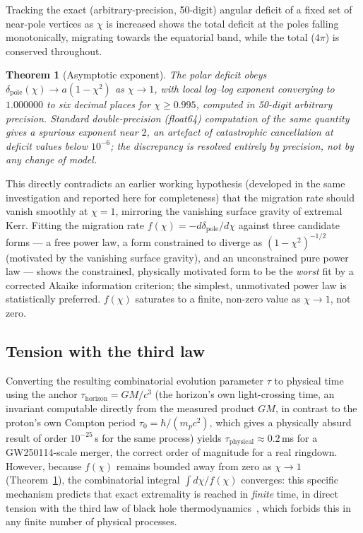 \documentclass[12pt,a4paper]{article}
\newtheorem{theorem}{Theorem}[section]
\newcommand{\hb}{\hbar}
\newcommand{\chif}{\chi}
\begin{document}
Tracking the exact (arbitrary-precision, 50-digit) angular deficit
of a fixed set of near-pole vertices as $\chif$ is increased shows
the total deficit at the poles falling monotonically, migrating
towards the equatorial band, while the total ($4\pi$) is conserved
throughout.

\begin{theorem}[Asymptotic exponent]
\label{thm:exponent}
The polar deficit obeys $\delta_{\mathrm{pole}}(\chif)\to
a(1-\chif^2)$ as $\chif\to1$, with local log--log exponent
converging to $1.000000$ to six decimal places for
$\chif\geq0.995$, computed in 50-digit arbitrary precision. Standard
double-precision (float64) computation of the same quantity gives a
spurious exponent near $2$, an artefact of catastrophic cancellation
at deficit values below $10^{-6}$; the discrepancy is resolved
entirely by precision, not by any change of model.
\end{theorem}

\begin{negativebox}
This directly contradicts an earlier working hypothesis (developed
in the same investigation and reported here for completeness) that
the migration rate should vanish smoothly at $\chif=1$, mirroring
the vanishing surface gravity of extremal Kerr. Fitting the
migration rate $f(\chif)=-d\delta_{\mathrm{pole}}/d\chif$ against
three candidate forms --- a free power law, a form constrained to
diverge as $(1-\chif^2)^{-1/2}$ (motivated by the vanishing surface
gravity), and an unconstrained pure power law --- shows the
constrained, physically motivated form to be the \emph{worst} fit
by a corrected Akaike information criterion; the simplest,
unmotivated power law is statistically preferred. $f(\chif)$
saturates to a finite, non-zero value as $\chif\to1$, not zero.
\end{negativebox}

\subsection{Tension with the third law}

Converting the resulting combinatorial evolution parameter $\tau$ to
physical time using the anchor $\tau_{\mathrm{horizon}}=GM/c^3$
(the horizon's own light-crossing time, an invariant computable
directly from the measured product $GM$, in contrast to the
proton's own Compton period $\tau_0=\hb/(m_pc^2)$, which gives a
physically absurd result of order $10^{-25}\,$s for the same
process) yields $\tau_{\mathrm{physical}}\approx0.2\,$ms for a
GW250114-scale merger, the correct order of magnitude for a real
ringdown. However, because $f(\chif)$ remains bounded away from zero
as $\chif\to1$ (Theorem~\ref{thm:exponent}), the combinatorial
integral $\int d\chif/f(\chif)$ converges: this specific
mechanism predicts that exact extremality is reached in \emph{finite}
time, in direct tension with the third law of black hole
thermodynamics~\citep{BardeenCarterHawking1973}, which forbids this
in any finite number of physical processes.
\end{document}

